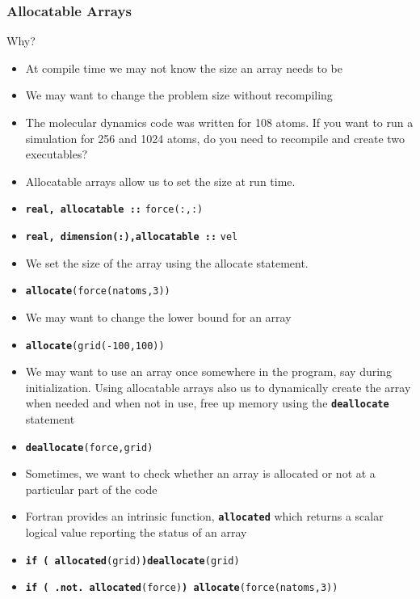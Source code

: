 \documentclass[slidestop,mathserif,compress,xcolor=svgnames]{beamer}
\newcommand{\bftt}[1]{\textbf{\texttt{#1}}}
\begin{document}
\begin{frame}[allowframebreaks]
  \frametitle{\small Allocatable Arrays}
  \begin{block}{\scriptsize Why?}
    \begin{itemize}
      \item At compile time we may not know the size an array needs to be
      \item We may want to change the problem size without recompiling
      \item The molecular dynamics code was written for 108 atoms. If you want to run a simulation for 256 and 1024 atoms, do you need to recompile and create two executables?
    \end{itemize}
  \end{block}
  \begin{block}{}
    \begin{itemize}
      \item Allocatable arrays allow us to set the size at run time.
      \item[] \textbf{\texttt{real, allocatable ::}} \texttt{force(:,:)}
      \item[] \textbf{\texttt{real, dimension(:),allocatable ::}} \texttt{vel}
      \item We set the size of the array using the allocate statement.
      \item[] \textbf{\texttt{allocate}}\texttt{(force(natoms,3))}
      \item We may want to change the lower bound for an array
      \item[] \textbf{\texttt{allocate}}\texttt{(grid(-100,100))}
      \item We may want to use an array once somewhere in the program, say during initialization. Using allocatable arrays also us to dynamically create the array when needed and when not in use, free up memory using the \textbf{\texttt{deallocate}} statement
      \item[] \textbf{\texttt{deallocate}}\texttt{(force,grid)}
    \end{itemize}
  \end{block}
  \begin{block}{}
    \begin{itemize}
      \item Sometimes, we want to check whether an array is allocated or not at a particular part of the code
      \item Fortran provides an intrinsic function, \textbf{\texttt{allocated}} which returns a scalar logical value reporting the status of an array
      \item[] \textbf{\texttt{if ( allocated}}\texttt{(grid)}\bftt{)deallocate}\texttt{(grid)}
      \item[] \textbf{\texttt{if ( .not. allocated}}\texttt{(force)}\bftt{) allocate}\texttt{(force(natoms,3))}
    \end{itemize}
  \end{block}
\end{frame}
\end{document}
